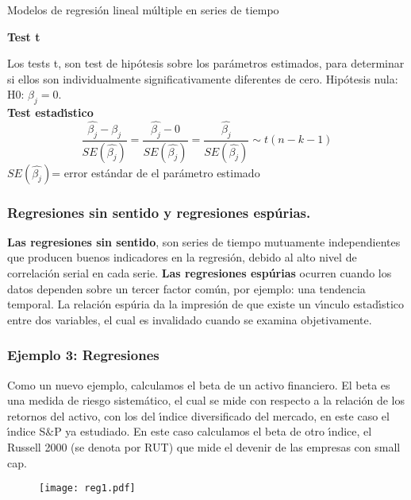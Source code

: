 \documentclass[xcolor=(list of options)]{beamer}
\begin{document}
\begin{section}{Modelos de regresi\'on lineal m\'ultiple en series de tiempo}
\begin{frame}
\textbf{Test t}

Los tests t, son test de hip\'otesis sobre los par\'ametros estimados, para determinar si ellos son individualmente significativamente diferentes de cero. Hip\'otesis nula: H0: $\beta_j  = 0$.\\
\vspace{5mm}
\textbf{Test estad\'\i{}stico}
\\
\begin{equation*}
\frac{\hat{\beta_j} - \beta_j}{ SE(\hat{\beta_j}) } = \frac{\hat{\beta_j} - 0}{ SE(\hat{\beta_j}) } = \frac{\hat{\beta_j}}{ SE(\hat{\beta_j}) } \sim t(n - k - 1)
\end{equation*}
\vspace{5mm}
$SE(\hat{\beta_j})$= error est\'andar de el par\'ametro estimado


\end{frame}
\begin{frame}
\frametitle{Regresiones sin sentido y regresiones esp\'urias.}

\textbf{Las regresiones sin sentido}, son series de tiempo mutuamente independientes que producen buenos indicadores en la regresi\'on, debido al alto nivel de correlaci\'on serial en cada serie.
\vspace{5mm}
\textbf{Las regresiones esp\'urias} ocurren cuando los datos dependen sobre un tercer factor com\'un, por ejemplo: una tendencia temporal. La relaci\'on esp\'uria da la impresi\'on de que existe un v\'\i{}nculo estad\'\i{}stico entre dos variables, el cual es invalidado cuando se examina objetivamente.

\end{frame}

\begin{frame}
\frametitle{Ejemplo 3: Regresiones}
Como un nuevo ejemplo, calculamos el beta de un activo financiero. El beta es una medida de riesgo sistem\'atico, el cual se mide con respecto a la relaci\'on de los retornos del activo, con los del \'\i{}ndice diversificado del mercado, en este caso el \'\i{}ndice S$\&$P ya estudiado. En este caso calculamos el beta de otro \'\i{}ndice, el Russell 2000 (se denota por RUT) que mide el devenir de las empresas con small cap. 

\begin{figure}[t!]
\texttt{[image: reg1.pdf]}
\end{figure}


\end{frame}
\end{section}
\end{document}
